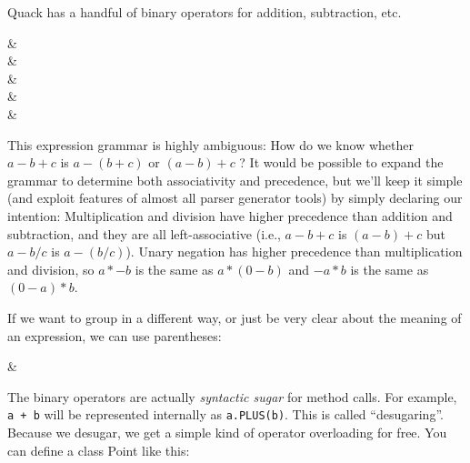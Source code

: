 \documentclass[11pt]{article}
\begin{document}
Quack has a handful of binary operators for addition, subtraction,
etc.  

\begin{grammar}
 & 
     \literal{+} \\ 
 & 
     \literal{-} \\ 
 & 
     \literal{*} \\ 
 & 
     \literal{/} \\ 
  &
    \literal{-} \\ 
\end{grammar}

This expression grammar is highly ambiguous:  How do we know whether
\(a-b+c\) is \(a-(b+c)\) or \((a-b)+c\) ?  It would be
possible to expand the grammar to determine both associativity and
precedence, but we'll keep it simple (and exploit features of almost
all parser generator tools) by simply declaring our intention:
Multiplication and division have higher precedence than addition and
subtraction, and they are all left-associative (i.e., \(a-b+c\) is
\((a-b)+c\) but \(a-b/c\) is \(a-(b/c)\)).   Unary negation has higher
precedence than multiplication and division, so \( a * - b \) is the
same as \( a * (0 - b)\) and \( -a * b\) is the same as 
\( (0-a) * b\). 


If we want to group in a different way, or just be very clear about
the meaning of an expression, we can use parentheses: 

\begin{grammar}
 & 
   \literal{(}  \literal{)}
\end{grammar}

The binary operators are  actually \emph{syntactic sugar}  for method calls.  For example, 
\verb|a + b| will be represented internally as \verb|a.PLUS(b)|.  This
is called ``desugaring''.    Because we desugar, we get a simple kind
of operator overloading for free.  You can define a class Point like
this: 
\end{document}
